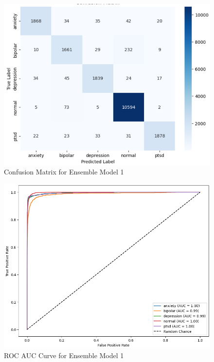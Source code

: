 \begin{figure}[h!]  
    \centering
    \includegraphics[width=1.0\textwidth]{Images/EM CM.png}  
    \caption{Confusion Matrix for Ensemble Model 1}
    \label{dfdl3123}  %
\end{figure}

\begin{figure}[h!]  
    \centering
    \includegraphics[width=1.0\textwidth]{Images/EM ROC.png}  
    \caption{ROC AUC Curve for Ensemble Model 1}
    \label{dfdl12443}  %
\end{figure}

